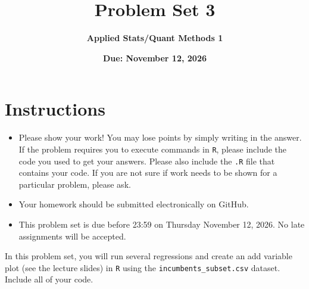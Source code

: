 \documentclass[12pt,letterpaper]{article}
\title{\textbf{Problem Set 3}}
\date{\textbf{Due: November 12, 2026}}
\author{\textbf{Applied Stats/Quant Methods 1}}
\begin{document}
	\maketitle
	\section*{Instructions}
	\begin{itemize}
		\item Please show your work! You may lose points by simply writing in the answer. If the problem requires you to execute commands in \texttt{R}, please include the code you used to get your answers. Please also include the \texttt{.R} file that contains your code. If you are not sure if work needs to be shown for a particular problem, please ask.
	\item Your homework should be submitted electronically on GitHub.
	\item This problem set is due before 23:59 on Thursday November 12, 2026. No late assignments will be accepted.

	\end{itemize}

		\vspace{.25cm}
	
\noindent In this problem set, you will run several regressions and create an add variable plot (see the lecture slides) in \texttt{R} using the \texttt{incumbents\_subset.csv} dataset. Include all of your code.

	\vspace{.5cm}
\end{document}

